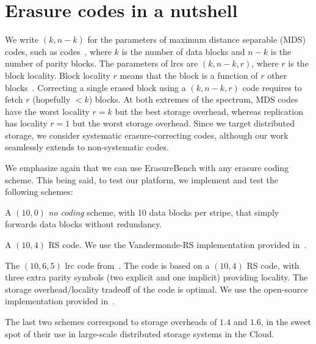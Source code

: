 \section{Erasure codes in a nutshell}
\label{sec:codes}

We write $(k,n-k)$ for the parameters of maximum distance separable (MDS) codes, such as  codes~\autocite{reed-solomon}, where $k$ is the number of data blocks and $n-k$ is the number of parity blocks. 
The parameters of \acp{lrc} are  $(k,n-k,r)$, where $r$ is the block locality. 
Block locality $r$ means that the block is a function of $r$ other blocks~\autocite{XorbasVLDB}. Correcting a single erased block using a $(k,n-k,r)$ code requires to fetch $r$ (hopefully $<k$) blocks. 
At both extremes of the spectrum, MDS codes have the worst locality $r=k$ but the best storage overhead, whereas replication has locality $r=1$ but the worst storage overhead. 
Since we target distributed storage, we consider systematic erasure-correcting codes, although our work seamlessly extends to non-systematic codes. %

We emphasize again that we can use ErasureBench with any erasure coding scheme. This being said, to test our platform, we implement and test the following schemes:
\begin{description}
\item[\textbf{NC}] A $(10,0)$ \emph{no coding} scheme, with 10 data blocks per stripe, that simply forwards data blocks without redundancy. %
\item[\textbf{\acs{rs}}] A $(10,4)$ RS code. We use the Vandermonde-RS implementation provided in~\autocite{XorbasVLDB}.  
\item[\textbf{\acs{lrc}}] The $(10,6,5)$ \acs{lrc} code from~\autocite{XorbasVLDB}. The code is based on a $(10,4)$ RS code, with three extra parity symbols (two explicit and one implicit) providing locality. The storage overhead/locality tradeoff of the code is optimal. We use the open-source implementation provided in~\autocite{XorbasVLDB}.
\end{description}
The last two schemes correspond to storage overheads of $1.4$ and $1.6$, in the sweet spot of their use in large-scale distributed storage systems in the Cloud.

